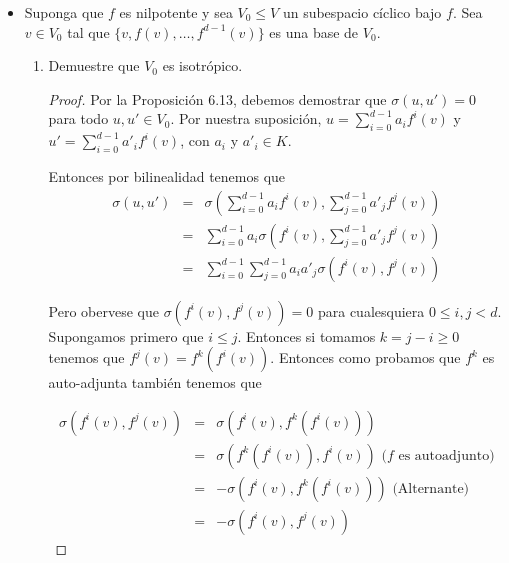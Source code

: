 \documentclass[letter,twoside,12pt]{article}
\begin{document}
\begin{itemize}
\begin{proof}
Por la propiedad 2.20 tenemos que para cada $ i $ existe un polinomio $ \Pi_i(t) \in K[t] $ tal que $ \Pi_i(f) = p_i $ donde $ p_i $ es la proyección sobre el espacio $ V_i $. Anteriormente demostramos que cualquier polinomio de $ f $ es auto-adjunto por lo que $ p_i $ es auto-adjunto y además en el literal anterior demostramos que la imagen de una proyección auto-adjunto es un subespacio simpléctico. Luego, cada $ V_i $ es un subespacio simpléctico.
\end{proof}

\item Suponga que $f$ es nilpotente y sea $V_0\le V$ un subespacio c\'iclico bajo $f$. Sea $v\in V_0$ tal que $\{v,f(v),\ldots,f^{d-1}(v)\}$ es una base de $V_0$.
\begin{enumerate}
\item Demuestre que $V_0$ es isotr\'opico.

\begin{proof}
Por la Proposición 6.13, debemos demostrar que $ \sigma(u,u')= 0 $ para todo $ u,u' \in V_0 $. Por nuestra suposición, $ u = \sum_{i=0}^{d-1}a_if^i(v) $ y $ u' = \sum_{i=0}^{d-1}a'_if^i(v) $, con $ a_i $ y $ a'_i \in K $.

Entonces por bilinealidad tenemos que
\begin{eqnarray} 
\sigma(u,u')&=& \sigma(\sum_{i=0}^{d-1}a_if^i(v),\sum_{j=0}^{d-1}a'_jf^j(v)) \nonumber
\\&=& \sum_{i=0}^{d-1}a_i\sigma(f^i(v),\sum_{j=0}^{d-1}a'_jf^j(v)) \nonumber
\\&=& \sum_{i=0}^{d-1}\sum_{j=0}^{d-1}a_ia'_j\sigma(f^i(v),f^j(v)) \nonumber
\end{eqnarray} 

Pero obervese que $ \sigma(f^{i}(v),f^{j}(v))= 0$ para cualesquiera $ 0\leq i,j < d $. Supongamos primero que $ i \leq j $. Entonces si tomamos $ k = j-i \geq 0 $ tenemos que $ f^{j}(v)=f^k(f^i(v)) $. Entonces como probamos que $ f^{k} $ es auto-adjunta también tenemos que

\begin{eqnarray}
\sigma(f^{i}(v),f^{j}(v)) &=& \sigma(f^{i}(v),f^k(f^i(v))) \nonumber
\\&=& \sigma(f^k(f^{i}(v)),f^i(v)) \text{ ($f$ es autoadjunto)} \nonumber
\\&=& -\sigma(f^i(v),f^k(f^{i}(v))) \text{ (Alternante)} \nonumber
\\&=& -\sigma(f^{i}(v),f^{j}(v)) \nonumber
\end{eqnarray}


\end{proof}
\end{enumerate}
\end{itemize}
\end{document}
